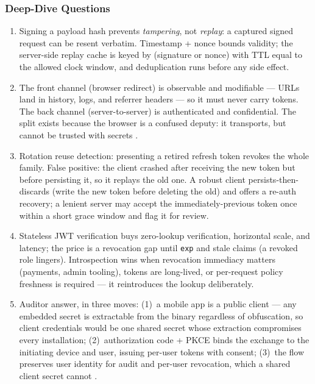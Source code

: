 \subsubsection*{Deep-Dive Questions}

\begin{enumerate}[leftmargin=2.2em]
  \item Signing a payload hash prevents \emph{tampering}, not
    \emph{replay}: a captured signed request can be resent verbatim.
    Timestamp + nonce bounds validity; the server-side replay cache is keyed
    by (signature or nonce) with TTL equal to the allowed clock window, and
    deduplication runs before any side effect.
  \item The front channel (browser redirect) is observable and modifiable
    --- URLs land in history, logs, and referrer headers --- so it must
    never carry tokens. The back channel (server-to-server) is
    authenticated and confidential. The split exists because the browser is
    a confused deputy: it transports, but cannot be trusted with secrets
    \cite{rfc6749}.
  \item Rotation reuse detection: presenting a retired refresh token
    revokes the whole family. False positive: the client crashed after
    receiving the new token but before persisting it, so it replays the old
    one. A robust client persists-then-discards (write the new token before
    deleting the old) and offers a re-auth recovery; a lenient server may
    accept the immediately-previous token once within a short grace window
    and flag it for review.
  \item Stateless JWT verification buys zero-lookup verification,
    horizontal scale, and latency; the price is a revocation gap until
    \texttt{exp} and stale claims (a revoked role lingers). Introspection
    wins when revocation immediacy matters (payments, admin tooling),
    tokens are long-lived, or per-request policy freshness is required ---
    it reintroduces the lookup deliberately.
  \item Auditor answer, in three moves: (1)~a mobile app is a public client
    --- any embedded secret is extractable from the binary regardless of
    obfuscation, so client credentials would be one shared secret whose
    extraction compromises every installation; (2)~authorization code +
    PKCE binds the exchange to the initiating device and user, issuing
    per-user tokens with consent; (3)~the flow preserves user identity for
    audit and per-user revocation, which a shared client secret cannot
    \cite{rfc7636, owaspapisecurity}.
\end{enumerate}

